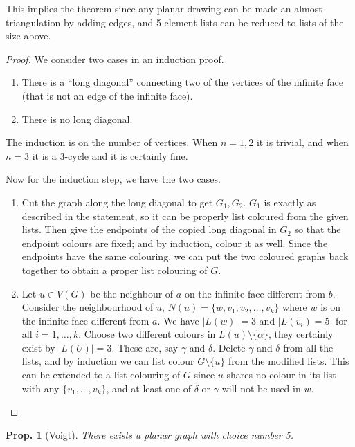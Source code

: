 \documentclass[12pt, a4paper]{book}
\newtheorem{proposition}[theorem]{Prop.}
\theoremstyle{nonumberplain}
\newtheorem{proof}{Proof}
\begin{document}
This implies the theorem since any planar drawing can be made an almost-triangulation by adding edges, and 5-element lists can be reduced to lists of the size above.
\begin{proof}
    We consider two cases in an induction proof.
    \begin{enumerate}[nolistsep]
        \item There is a ``long diagonal'' connecting two of the vertices of the infinite face (that is not an edge of the infinite face).
        \item There is no long diagonal.
    \end{enumerate}
    The induction is on the number of vertices.
    When $n=1,2$ it is trivial, and when $n=3$ it is a 3-cycle and it is certainly fine.

    Now for the induction step, we have the two cases.
    \begin{enumerate}
        \item Cut the graph along the long diagonal to get $G_1,G_2$.
            $G_1$ is exactly as described in the statement, so it can be properly list coloured from the given lists.
            Then give the endpoints of the copied long diagonal in $G_2$ so that the endpoint colours are fixed; and by induction, colour it as well.
            Since the endpoints have the same colouring, we can put the two coloured graphs back together to obtain a proper list colouring of $G$.
        \item Let $u\in V(G)$ be the neighbour of $a$ on the infinite face different from $b$.
            Consider the neighbourhood of $u$, $N(u)=\{w,v_1,v_2,\ldots,v_k\}$ where $w$ is on the infinite face different from $a$.
            We have $|L(w)|=3$ and $|L(v_i)=5|$ for all $i=1,\ldots,k$.
            Choose two different colours in $L(u)\setminus\{\alpha\}$, they certainly exist by $|L(U)|=3$.
            These are, say $\gamma$ and $\delta$.
            Delete $\gamma$ and $\delta$ from all the lists, and by induction we can list colour $G\setminus\{u\}$ from the modified lists.
            This can be extended to a list colouring of $G$ since $u$ shares no colour in its list with any $\{v_1,\ldots,v_k\}$, and at least one of $\delta$ or $\gamma$ will not be used in $w$.
    \end{enumerate}
\end{proof}
\begin{proposition}[Voigt]
    There exists a planar graph with choice number 5.
\end{proposition}
\end{document}
